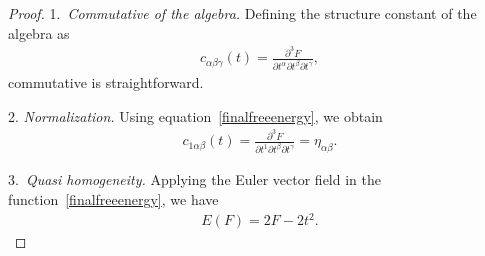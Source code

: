 \documentclass[pdftex]{sigma}%
\numberwithin{equation}{section}
\begin{document}
\begin{proof}
1.\ \textit{Commutative of the algebra.}
Defining the structure constant of the algebra as
\begin{gather*}
c_{\alpha\beta\gamma}(t)=\frac{\partial^3F}{\partial t^{\alpha}\partial t^{\beta}\partial t^{\gamma} },
\end{gather*}
commutative is straightforward.

2. \textit{Normalization.}
Using equation~\eqref{finalfreeenergy}, we obtain
\begin{gather*}
c_{1\alpha\beta}(t)=\frac{\partial^3F}{\partial t^{1}\partial t^{\beta}\partial t^{\gamma} }=\eta_{\alpha\beta}.
\end{gather*}

3.\ \textit{Quasi homogeneity.}
Applying the Euler vector field in the function~\eqref{finalfreeenergy}, we have
\begin{gather*}
E(F)=2F-2t^2.
\end{gather*}


\end{proof}
\end{document}
